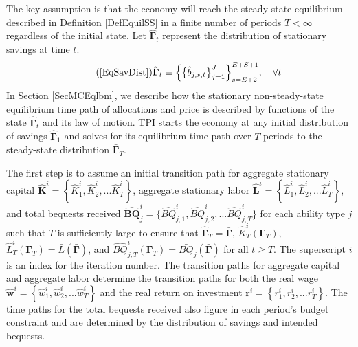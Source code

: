   The key assumption is that the economy will reach the steady-state equilibrium described in Definition \ref{DefEquilSS} in a finite number of periods $T<\infty$ regardless of the initial state. Let $\bm{\hat{\Gamma}}_t$ represent the distribution of stationary savings at time $t$.
  \begin{equation}\tag{\ref{EqSavDist}}
    \bm{\hat{\Gamma}}_t \equiv \Bigl\{\bigl\{\hat{b}_{j,s,t}\bigr\}_{j=1}^J\Bigr\}_{s=E+2}^{E+S+1}, \quad\forall t
  \end{equation}
  In Section \ref{SecMCEqlbm}, we describe how the stationary non-steady-state equilibrium time path of allocations and price is described by functions of the state $\bm{\hat{\Gamma}}_t$ and its law of motion. TPI starts the economy at any initial distribution of savings $\bm{\hat{\Gamma}}_1$ and solves for its equilibrium time path over $T$ periods to the steady-state distribution $\bm{\bar{\Gamma}}_T$.

  The first step is to assume an initial transition path for aggregate stationary capital $\bm{\hat{K}}^i = \left\{\hat{K}_1^i,\hat{K}_2^i,...\hat{K}_T^i\right\}$, aggregate stationary labor $\bm{\hat{L}}^i = \left\{\hat{L}_1^i,\hat{L}_2^i,...\hat{L}_T^i\right\}$, and total bequests received $\bm{\hat{BQ}}_j^i=\{\hat{BQ}_{j,1}^i,\hat{BQ}_{j,2}^i,...\hat{BQ}_{j,T}^i\}$ for each ability type $j$ such that $T$ is sufficiently large to ensure that $\bm{\hat{\Gamma}}_T = \bar{\bm{\Gamma}}$, $\hat{K}_T^i\left(\bm{\Gamma}_T\right)$, $\hat{L}_T^i\left(\bm{\Gamma}_T\right) = \bar{L}\left(\bar{\bm{\Gamma}}\right)$, and $\hat{BQ}_{j,T}^i\left(\bm{\Gamma}_T\right) = \bar{BQ}_j\left(\bar{\bm{\Gamma}}\right)$ for all $t\geq T$. The superscript $i$ is an index for the iteration number. The transition paths for aggregate capital and aggregate labor determine the transition paths for both the real wage $\bm{\hat{w}}^i = \left\{\hat{w}_1^i,\hat{w}_2^i,...\hat{w}_T^i\right\}$ and the real return on investment $\bm{r}^i = \left\{r_1^i,r_2^i,...r_T^i\right\}$. The time paths for the total bequests received also figure in each period's budget constraint and are determined by the distribution of savings and intended bequests.

